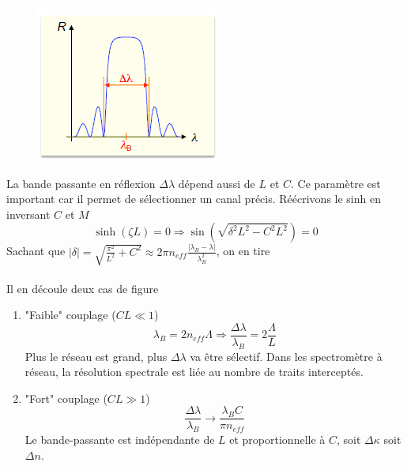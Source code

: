 	\begin{figure}
	\vspace{-8mm}
	\includegraphics[scale=0.6]{ch3/image13}
	\end{figure}
La bande passante en réflexion $\Delta\lambda$ dépend aussi de $L$ et $C$. Ce paramètre est
important car il permet de sélectionner un canal précis. Réécrivons le sinh en inversant $C$ et
$M$
\begin{equation}
\sinh (\zeta L) = 0 \Rightarrow \sin (\sqrt {{\delta ^2}{L^2} - {C^2}{L^2}} ) = 0
\end{equation}
Sachant que $\left| \delta  \right| = \sqrt {\frac{{{\pi ^2}}}{{{L^2}}} + {C^2}}  \approx 2\pi
 {n_{eff}}\frac{{\left| {{\lambda _B} - \lambda } \right|}}{{\lambda _B^2}}$, on en tire\\
 
 \ \\
 
 Il en découle deux cas de figure
 \begin{enumerate}
 \item "Faible" couplage ($CL\ll 1$)
 \begin{equation}
{\lambda _B} = 2{n_{eff}}\Lambda  \Rightarrow \frac{{\Delta \lambda }}{{{\lambda _B}}} =
 2\frac{\Lambda }{L}
 \end{equation}
 Plus le réseau est grand, plus $\Delta\lambda$ va être sélectif. Dans les spectromètre à réseau, 
 la résolution spectrale est liée au nombre de traits interceptés.
 \item "Fort" couplage ($CL \gg 1$)
 \begin{equation}
 \frac{{\Delta \lambda }}{{{\lambda _B}}} \to \frac{{{\lambda _B}C}}{{\pi {n_{eff}}}}
 \end{equation}
 Le bande-passante est indépendante de $L$ et proportionnelle à $C$, soit $\Delta \kappa$ soit
 $\Delta n$.
 \end{enumerate}

